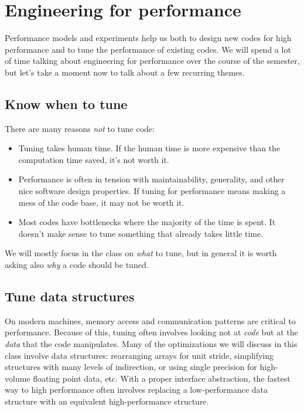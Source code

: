 \documentclass[12pt, leqno]{article} %
\begin{document}
\section{Engineering for performance}

Performance models and experiments help us both to design new codes for
high performance and to tune the performance of existing codes. We will
spend a lot of time talking about engineering for performance over the
course of the semester, but let's take a moment now to talk about a few
recurring themes.

\subsection{Know when to tune}

There are many reasons \emph{not} to tune code:

\begin{itemize}
\item
  Tuning takes human time. If the human time is more expensive than the
  computation time saved, it's not worth it.
\item
  Performance is often in tension with maintainability, generality, and
  other nice software design properties. If tuning for performance means
  making a mess of the code base, it may not be worth it.
\item
  Most codes have bottlenecks where the majority of the time is spent.
  It doesn't make sense to tune something that already takes little
  time.
\end{itemize}

We will mostly focus in the class on \emph{what} to tune, but in general
it is worth asking also \emph{why} a code should be tuned.

\subsection{Tune data structures}

On modern machines, memory access and communication patterns are
critical to performance. Because of this, tuning often involves looking
not at \emph{code} but at the \emph{data} that the code manipulates.
Many of the optimizations we will discuss in this class involve data
structures: rearranging arrays for unit stride, simplifying structures
with many levels of indirection, or using single precision for
high-volume floating point data, etc. With a proper interface
abstraction, the fastest way to high performance often involves
replacing a low-performance data structure with an equivalent
high-performance structure.
\end{document}
